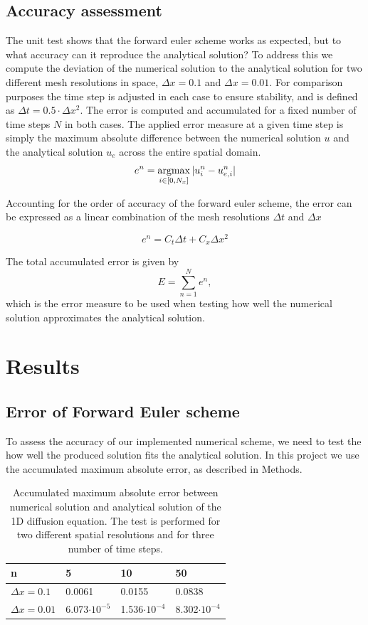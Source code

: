 \documentclass[12pt]{extarticle}
\begin{document}
\subsection*{Accuracy assessment}
The unit test shows that the forward euler scheme works as expected, but to what accuracy can it reproduce the analytical solution? To address this we compute the deviation of the numerical solution to the analytical solution for two different mesh resolutions in space, $\Delta x=0.1$ and $\Delta x = 0.01$. For comparison purposes the time step is adjusted in each case to ensure stability, and is defined as $\Delta t = 0.5\cdot \Delta x^2$. The error is computed and accumulated for a fixed number of time steps $N$ in both cases. The applied error measure at a given time step is simply the maximum absolute difference between the numerical solution $u$ and the analytical solution $u_e$ across the entire spatial domain.
\[ e^n = \operatorname*{argmax}_{i \in [0,N_x]} |u_i^n - u_{e,i}^n| \]

Accounting for the order of accuracy of the forward euler scheme, the error can be expressed as a linear combination of the mesh resolutions $\Delta t$ and $\Delta x$ \cite{Linge2017}

\[ e^n = C_t\Delta t + C_x\Delta x^2 \]

The total accumulated error is given by
\[ E = \sum_{n=1}^N e^n, \]
which is the error measure to be used when testing how well the numerical solution approximates the analytical solution.



\section{Results}

\subsection*{Error of Forward Euler scheme}

To assess the accuracy of our implemented numerical scheme, we need to test the how well the produced solution fits the analytical solution. In this project we use the accumulated maximum absolute error, as described in Methods.

\begin{table}[h]
	\centering
	\begin{tabular}{|l|l|l|l|}
		\hline
		\textbf{n}      & \textbf{5} & \textbf{10} & \textbf{50} \\ \hline
		$\Delta x=0.1$  & 0.0061     & 0.0155       & 0.0838       \\ \hline
		$\Delta x=0.01$ & 6.073$\cdot 10^{-5}$      & 1.536$\cdot 10^{-4}$       &   8.302$\cdot 10^{-4}$     \\ \hline
	\end{tabular}
\caption{Accumulated maximum absolute error between numerical solution and analytical solution of the 1D diffusion equation. The test is performed for two different spatial resolutions and for three number of time steps.}
\label{tab:errors}
\end{table}
\end{document}
